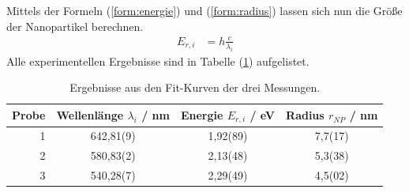 Mittels der Formeln (\ref{form:energie}) und (\ref{form:radius}) lassen sich nun die Gr\"{o}{\ss}e der Nanopartikel berechnen.
\begin{align}
	E_{r,i} &= h \frac{c}{\lambda_i} \label{form:energie}
\end{align}
Alle experimentellen Ergebnisse sind in Tabelle (\ref{tab:auf1a}) aufgelistet.
\begin{table}
	\centering
	\caption{Ergebnisse aus den Fit-Kurven der drei Messungen.}
\begin{tabular}{|r|ccc|}
	\hline
	{Probe} & {Wellenl\"{a}nge $\lambda_i$ / nm} & {Energie $E_{r,i}$ / eV} & {Radius $r_{NP}$ / nm} \\
	\hline
	1	& 642,81(9) &	1,92(89)	&	7,7(17)	\\
	2	& 580,83(2) &	2,13(48)	&	5,3(38)	\\
	3	& 540,28(7) &	2,29(49)	&	4,5(02)	\\
	\hline
\end{tabular}
\label{tab:auf1a}
\end{table}

